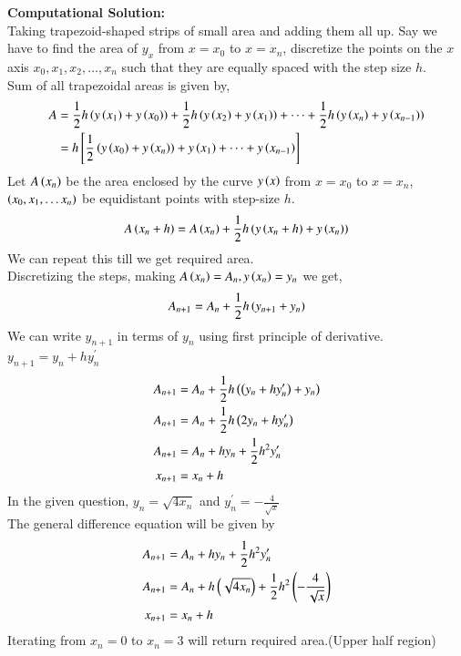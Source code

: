 \documentclass[journal]{IEEEtran}
\begin{document}
\textbf{Computational Solution:}\\

Taking trapezoid-shaped strips of small area and adding them all up. Say we have to find the area of $y_{x}$ from $x=x_0$ to $x=x_n$, discretize the points on the $x$ axis $x_0, x_1, x_2, \dots, x_n$ such that they are equally spaced with the step size $h$. \\
Sum of all trapezoidal areas is given by,
\begin{align}
  A&=\frac{1}{2}h\left(y\left(x_1\right)+y\left(x_0\right)\right)+ \frac{1}{2}h\left(y\left(x_2\right)+y\left(x_1\right)\right)+\dots+\frac{1}{2}h\left(y\left(x_n\right)+y\left(x_{n-1}\right)\right)\\
  &=h{}\left[\frac{1}{2}\left(y\left(x_0\right)+y\left(x_n\right)\right)+ y\left(x_1\right)+\dots+y\left(x_{n-1}\right)\right]
\end{align}
Let $A\left(x_n\right)$ be the area enclosed by the curve $y\left(x\right)$ from $x=x_0$ to $x=x_n$, $\left(x_0, x_1, \dots x_n\right)$ be equidistant points with step-size $h$.
\begin{align}
  A\left(x_n+h\right)=A\left(x_n\right)+\frac{1}{2}h\left(y\left(x_n+h\right)+y\left(x_n\right)\right)
\end{align}
We can repeat this till we get required area.\\
Discretizing the steps, making $A\left(x_n\right)=A_n, y\left(x_n\right)=y_n$ we get,
\begin{align}
 A_{n+1}=A_n+\frac{1}{2}h\left(y_{n+1}+y_n\right)
\end{align}
We can write $y_{n+1}$ in terms of $y_n$ using first principle of derivative. $y_{n+1}=y_n+hy^{\prime}_n$
\begin{align}
  A_{n+1}&=A_n+\frac{1}{2}h\left(\left(y_{n}+hy^{\prime}_n\right)+y_n\right)\\
  A_{n+1}&=A_n+\frac{1}{2}h\left(2y_n+hy^{\prime}_n\right)\\
  A_{n+1}&=A_n+hy_n+\frac{1}{2}h^2y^{\prime}_n\\
  x_{n+1}&=x_n+h
\end{align}
In the given question, $y_n=\sqrt{4x_n} $ and $y^{\prime}_n= -\frac{4}{\sqrt{x}}$\\
The general difference equation will be given by
\begin{align}
  A_{n+1}&=A_n+hy_n+\frac{1}{2}h^2y^{\prime}_n\\
  A_{n+1}&=A_n+h\left(\sqrt{4x_n} \right)+\frac{1}{2}h^2\left(-\frac{4}{\sqrt{x}}\right)\\
  x_{n+1}&=x_n+h
\end{align}
Iterating from $x_n=0$ to $x_n=3$ will return required area.(Upper half region) \\
\end{document}
